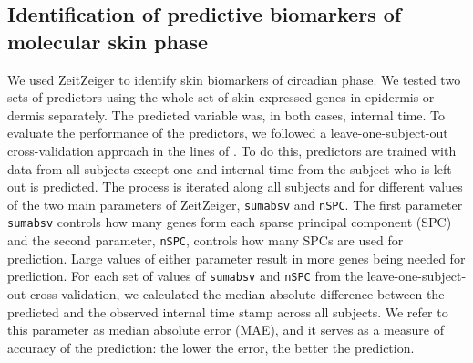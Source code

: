 \subsection*{Identification of predictive biomarkers of molecular skin phase}
We used ZeitZeiger \cite{Hughey2016} to identify skin biomarkers of circadian phase. We tested two sets of predictors using the whole set of skin-expressed genes in epidermis or dermis separately. The predicted variable was, in both cases, internal time. To evaluate the performance of the predictors, we followed a leave-one-subject-out cross-validation approach in the lines of \cite{Hughey2016, Wittenbrink2018}. To do this, predictors are trained with data from all subjects except one and internal time from the subject who is left-out is predicted. The process is iterated along all subjects and for different values of the two main parameters of ZeitZeiger, \texttt{sumabsv} and \texttt{nSPC}. The first parameter \texttt{sumabsv} controls how many genes form each sparse principal component (SPC) and the second parameter, \texttt{nSPC}, controls how many SPCs are used for prediction. Large values of either parameter result in more genes being needed for prediction. For each set of values of \texttt{sumabsv} and \texttt{nSPC} from the leave-one-subject-out cross-validation, we calculated the median absolute difference between the predicted and the observed internal time stamp across all subjects. We refer to this parameter as median absolute error (MAE), and it serves as a measure of accuracy of the prediction: the lower the error, the better the prediction. 





